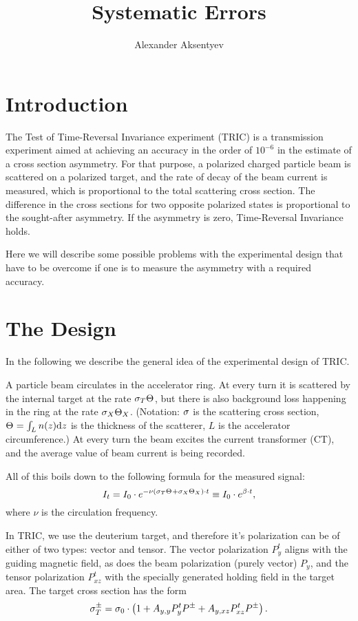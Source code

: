 \documentclass{article}
\begin{document}
\title{Systematic Errors}
\author{Alexander Aksentyev}
\maketitle

\section*{Introduction}

The Test of Time-Reversal Invariance experiment (TRIC) is a transmission experiment aimed at achieving an accuracy in the order of $10^{-6}$ in the estimate of a cross section asymmetry. For that purpose, a polarized charged particle beam is scattered on a polarized target, and the rate of decay of the beam current is measured, which is proportional to the total scattering cross section. The difference in the cross sections for two opposite polarized states is proportional to the sought-after asymmetry. If the asymmetry is zero, Time-Reversal Invariance holds.

Here we will describe some possible problems with the experimental design that have to be overcome if one is to measure the asymmetry with a required accuracy.

\section{The Design}
In the following we describe the general idea of the experimental design of TRIC.

A particle beam circulates in the accelerator ring. At every turn it is scattered by the internal target at the rate $\CS[T]\Thick$, but there is also background loss happening in the ring at the rate $\CS[X]\Thick[X]$. (Notation: $\CS$ is the scattering cross section, $\Thick = \int_L n(z)\td z$ is the thickness of the scatterer, $L$ is the accelerator circumference.) At every turn the beam excites the current transformer (CT), and the average value of beam current is being recorded. 

All of this boils down to the following formula for the measured signal:
\[
	I_t  = I_0 \cdot e^{-\nu\bkt{\CS[T]\Thick + \CS[X]\Thick[X]}\cdot t} \equiv I_0\cdot e^{\slp\cdot t},
\]
where $\nu$ is the circulation frequency.

In TRIC, we use the deuterium target, and therefore it's polarization can be of either of two types: vector and tensor. The vector polarization $P^t_y$ aligns with the guiding magnetic field, as does the beam polarization (purely vector) $P_y$, and the tensor polarization $P^t_{xz}$ with the specially generated holding field in the target area.  The target cross section has the form
\begin{equation}\label{eq:CrossSection}
	\CS[T]^\pm = \CS[0]\cdot\bkt{1 + \Ayy P^t_y P^\pm + \Ayxz P^t_{xz} P^\pm}.
\end{equation}
\end{document}
